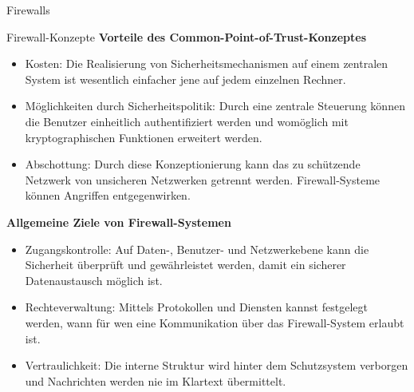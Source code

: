 \begin{section}{Firewalls}
\begin{subsection}{Firewall-Konzepte}
  	\textbf{Vorteile des Common-Point-of-Trust-Konzeptes}
  	\begin{itemize}
  		\item Kosten:
  			Die Realisierung von Sicherheitsmechanismen auf einem zentralen System ist wesentlich einfacher jene 
  			auf jedem einzelnen Rechner.
  		\item Möglichkeiten durch Sicherheitspolitik:
  			Durch eine zentrale Steuerung können die Benutzer einheitlich authentifiziert werden und womöglich 
  			mit kryptographischen Funktionen erweitert werden.
  		\item Abschottung:
  			Durch diese Konzeptionierung kann das zu schützende Netzwerk von unsicheren Netzwerken getrennt werden.
  			Firewall-Systeme können Angriffen entgegenwirken.
  	\end{itemize}
  	
  	\textbf{Allgemeine Ziele von Firewall-Systemen}
  	\begin{itemize}
  		\item Zugangskontrolle:
  			Auf Daten-, Benutzer- und Netzwerkebene kann die Sicherheit überprüft und gewährleistet werden, 
  			damit ein sicherer Datenaustausch möglich ist.
  		\item Rechteverwaltung:
  			Mittels Protokollen und Diensten kannst festgelegt werden, wann für wen eine Kommunikation über das 
  			Firewall-System erlaubt ist.
  		\item Vertraulichkeit:
  			Die interne Struktur wird hinter dem Schutzsystem verborgen und Nachrichten werden nie im Klartext 
  			übermittelt.
  	\end{itemize}
  \end{subsection}
 \end{section}
\pagebreak
